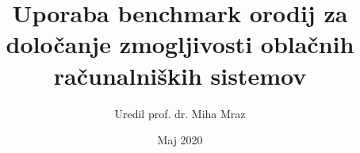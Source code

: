 \documentclass[slovene]{book}
\begin{document}
\hypersetup{pageanchor=false}

\author{Uredil prof. dr. Miha Mraz}
\title{Uporaba benchmark orodij za določanje zmogljivosti oblačnih računalniških sistemov}
\date{Maj 2020}
\maketitle

\frontmatter
\tableofcontents


\mainmatter

 
% 

\backmatter
%
%
\end{document}
